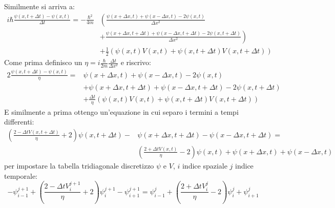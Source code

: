 \documentclass[]{article}
\newcommand{\lr}[3]{\ensuremath{\left#1 #3 \right#2}}
\newcommand{\lrt}[1]{\lr{(}{)}{#1}}
\numberwithin{equation}{subsection}
\begin{document}
Similmente si arriva  a:
$$\begin{aligned}
i\hbar\frac{\psi(x,t+\Delta t)-\psi(x,t)}{\Delta t} = -\frac{\hbar^2}{4m} &\lr(.{\frac{\psi(x+\Delta x,t)+\psi(x-\Delta x,t)-2\psi(x,t)}{\Delta x^2}}\\
&\lr.){+\frac{\psi(x+\Delta x,t+\Delta t)+\psi(x-\Delta x,t+\Delta t)-2\psi(x,t+\Delta t)}{\Delta x^2}}\\
&+ \frac 12\lrt{\psi(x,t)V(x,t)+ \psi(x,t+\Delta t)V(x,t+\Delta t)}
\end{aligned}$$
Come prima definisco un $\eta = i\frac{\hbar}{2m} \frac{\Delta t}{\Delta x^2} $ e riscrivo:
$$\begin{aligned}
2\frac{\psi(x,t+\Delta t)-\psi(x,t)}{\eta} = & \psi(x+\Delta x,t)+\psi(x-\Delta x,t)-2\psi(x,t)\\
&+\psi(x+\Delta x,t+\Delta t)+\psi(x-\Delta x,t+\Delta t)-2\psi(x,t+\Delta t)\\
&+ \frac {\Delta t}\eta\lrt{\psi(x,t)V(x,t)+ \psi(x,t+\Delta t)V(x,t+\Delta t)}
\end{aligned}$$
E similmente a  prima ottengo un'equazione in cui separo i termini a tempi differenti:
$$\begin{aligned}
\lrt{\frac{2-\Delta t V(x,t+\Delta t)}{\eta}+2}\psi(x,t+\Delta t) -&\psi(x+\Delta x,t+\Delta t)-\psi(x-\Delta x,t+\Delta t) =\\
& \lrt{\frac{2+\Delta t V(x,t)}{\eta}-2}\psi(x,t) +\psi(x+\Delta x,t)+\psi(x-\Delta x,t)
\end{aligned}$$
per impostare la tabella tridiagonale discretizzo $\psi$ e $V$, $i$ indice spaziale $j$ indice temporale:
$$
-\psi_{i-1}^{j+1}+\lrt{\frac{2-\Delta t V_i^{j+1}}{\eta}+2}\psi_{i}^{j+1} -\psi_{i+1}^{j+1} = 
\psi_{i-1}^{j}+\lrt{\frac{2+ \Delta t V_{i}^{j}}{\eta}-2}\psi_{i}^{j} +\psi_{i+1}^{j}
$$
\end{document}
